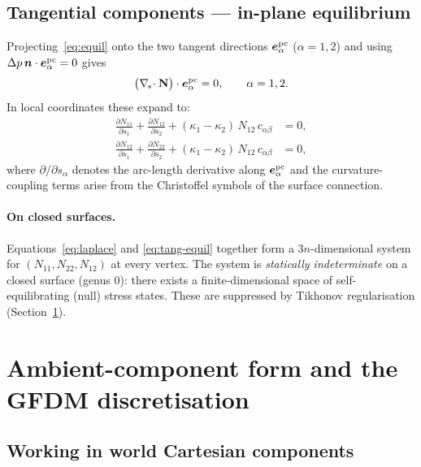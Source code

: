 \documentclass[11pt]{article}
\newcommand{\vv}[1]{\bm{#1}}          %
\newcommand{\nn}{\vv{n}}               %
\newcommand{\Nb}{\mathbf{N}}           %
\newcommand{\kone}{\kappa_1}
\newcommand{\ktwo}{\kappa_2}
\newcommand{\divs}{\nabla_{\!s}\!\cdot}
\begin{document}
\subsection{Tangential components --- in-plane equilibrium}
\label{sec:tangential}

Projecting~\eqref{eq:equil} onto the two tangent directions $\vv{e}_\alpha^{\rm
pc}$ ($\alpha=1,2$) and using $\Delta p\,\nn\cdot\vv{e}_\alpha^{\rm pc}=0$ gives
\begin{equation}
  \bigl(\divs\Nb\bigr)\cdot\vv{e}_\alpha^{\rm pc} = 0, \qquad \alpha=1,2.
  \label{eq:tang-equil}
\end{equation}
In local coordinates these expand to:
\begin{align}
  \frac{\partial N_{11}}{\partial s_1}
  + \frac{\partial N_{12}}{\partial s_2}
  + (\kone-\ktwo)\,N_{12}\,c_{\alpha\beta}
  &= 0, \label{eq:tang1} \\[4pt]
  \frac{\partial N_{12}}{\partial s_1}
  + \frac{\partial N_{22}}{\partial s_2}
  + (\kone-\ktwo)\,N_{12}\,c_{\alpha\beta}
  &= 0, \label{eq:tang2}
\end{align}
where $\partial/\partial s_\alpha$ denotes the arc-length derivative along
$\vv{e}_\alpha^{\rm pc}$ and the curvature-coupling terms arise from the
Christoffel symbols of the surface connection.

\paragraph{On closed surfaces.}  Equations~\eqref{eq:laplace} and
\eqref{eq:tang-equil} together form a $3n$-dimensional system for $(N_{11},
N_{22},N_{12})$ at every vertex.  The system is \emph{statically indeterminate}
on a closed surface (genus 0): there exists a finite-dimensional space of
self-equilibrating (null) stress states.  These are suppressed by Tikhonov
regularisation (Section~\ref{sec:gfdm}).

\section{Ambient-component form and the GFDM discretisation}
\label{sec:gfdm}

\subsection{Working in world Cartesian components}
\end{document}
